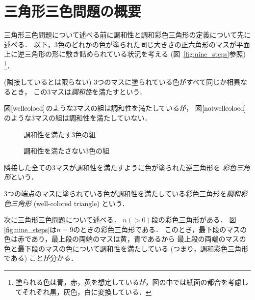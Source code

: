 \section{三角形三色問題の概要}
三角形三色問題について述べる前に調和性と調和彩色三角形の定義について先に述べる．
以下，$3$色のどれかの色が塗られた同じ大きさの正六角形のマスが平面上に逆三角形の形に敷き詰められている状況を考える (図~\ref{fig:nine_steps}参照)
\footnote{
  塗られる色は青，赤，黄を想定しているが，図の中では紙面の都合を考慮してそれぞれ黒，灰色，白に変換している．
}．

\begin{dfn}[調和性] \label{dfn:wc}\rm
  (隣接しているとは限らない) $3$つのマスに塗られている色がすべて同じか相異なるとき，
  この$3$マスは{\em 調和性}を満たすという．
\end{dfn}

\begin{exm}
  図$\ref{wellcoloed}$のような$3$マスの組は調和性を満たしているが，
  図$\ref{notwellcoloed}$のような$3$マスの組は調和性を満たしていない．
  \begin{figure}[h]
    \centering
    
    \caption{調和性を満たす$3$色の組}
    \label{wellcoloed}
  \end{figure}
  \begin{figure}[h]
    \centering
    
    \caption{調和性を満たさない$3$色の組}
    \label{notwellcoloed}
  \end{figure}
\end{exm}

\begin{dfn}[彩色三角形] \label{dfn:three_tri}\rm
  隣接した全ての$3$マスが調和性を満たすように色が塗られた逆三角形を
  {\em 彩色三角形}という．
\end{dfn}

\begin{dfn}[調和彩色三角形] \label{dfn:wc_tri}\rm
  $3$つの端点のマスに塗られている色が調和性を満たしている彩色三角形を{\em 調和彩色三角形} (well-colored triangle) という．
\end{dfn}

次に三角形三色問題について述べる．
  $n(>0)$段の彩色三角形がある．
  図\ref{fig:nine_steps}は$n=9$のときの彩色三角形である．
  このとき，最下段のマスの色は赤であり，最上段の両端のマスは黄，青であるから
  最上段の両端のマスの色と最下段のマスの色について調和性を満たしている (つまり，調和彩色三角形である) ことが分かる．

